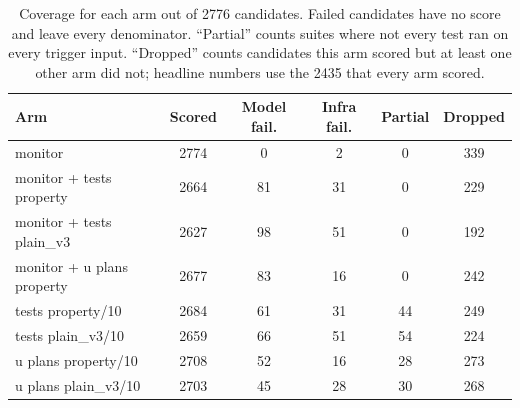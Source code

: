 \begin{table}[t]
\centering
\small
\begin{tabular}{lccccc}
\hline
Arm & Scored & Model fail. & Infra fail. & Partial & Dropped \\
\hline
monitor                    & 2774 & 0  & 2  & 0  & 339 \\
monitor + tests property   & 2664 & 81 & 31 & 0  & 229 \\
monitor + tests plain\_v3  & 2627 & 98 & 51 & 0  & 192 \\
monitor + u plans property & 2677 & 83 & 16 & 0  & 242 \\
tests property/10          & 2684 & 61 & 31 & 44 & 249 \\
tests plain\_v3/10         & 2659 & 66 & 51 & 54 & 224 \\
u plans property/10        & 2708 & 52 & 16 & 28 & 273 \\
u plans plain\_v3/10       & 2703 & 45 & 28 & 30 & 268 \\
\hline
\end{tabular}
\caption{Coverage for each arm out of 2776 candidates. Failed candidates have
no score and leave every denominator. ``Partial'' counts suites where not every
test ran on every trigger input. ``Dropped'' counts candidates this arm scored
but at least one other arm did not; headline numbers use the 2435 that every
arm scored.}
\label{tab:coverage}
\end{table}

